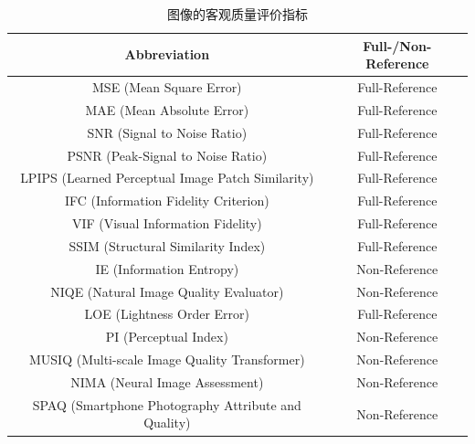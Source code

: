 \documentclass[a4paper]{ctexart}
\begin{document}
	\begin{table}[!htbp]
		\centering
		\small
			\begin{tabular}{cc}
				
				\toprule
				
				\textbf{Abbreviation} & \textbf{Full-/Non-Reference} \\
				
				\hline
				
				MSE (Mean Square Error)\cite{singh2016contrast,dong2010fast} & Full-Reference \\
				MAE (Mean Absolute Error)\cite{chai2014root} & Full-Reference \\
				SNR (Signal to Noise Ratio)\cite{kellman2005image} & Full-Reference \\
				PSNR (Peak-Signal to Noise Ratio)\cite{yu2017low} & Full-Reference \\
				LPIPS (Learned Perceptual Image Patch Similarity)\cite{zhang2018unreasonable} & Full-Reference \\
				IFC (Information Fidelity Criterion)\cite{sheikh2005information} & Full-Reference \\
				VIF (Visual Information Fidelity)\cite{russakovsky2015imagenet} & Full-Reference \\
				SSIM (Structural Similarity Index)\cite{ignatov2018wespe} & Full-Reference \\
				IE (Information Entropy)\cite{zhu2015low} & Non-Reference \\
				NIQE (Natural Image Quality Evaluator)\cite{mittal2012making} & Non-Reference \\
				LOE (Lightness Order Error)\cite{fu2016weighted} & Full-Reference \\
				PI (Perceptual Index)\cite{ma2017learning} & Non-Reference \\
				MUSIQ (Multi-scale Image Quality Transformer)\cite{ke2021musiq} & Non-Reference \\
				NIMA (Neural Image Assessment)\cite{talebi2018nima} & Non-Reference \\
				SPAQ (Smartphone Photography Attribute and Quality)\cite{fang2020perceptual} & Non-Reference \\
				
				\bottomrule
				
			\end{tabular}
		\caption{\label{tab: quality evaluation index}
			图像的客观质量评价指标
		} %
	\end{table}
	
\end{document}
